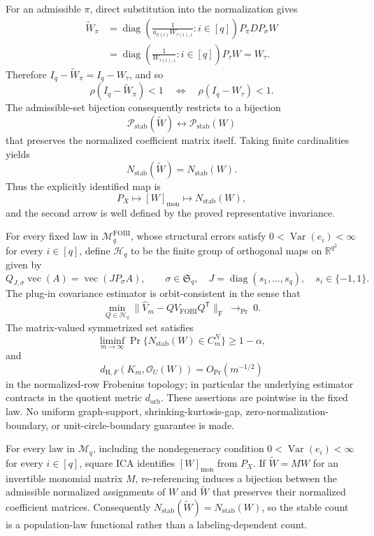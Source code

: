 For an admissible \(\pi\), direct substitution into the normalization gives
\[
 \begin{aligned}
 \widetilde W_\pi
 &=\operatorname{diag}\!\left(
      \frac{1}{a_{\pi(i)}W_{\tau(i),i}}:i\in[q]
    \right)P_\pi D P_\sigma W\\
 &=\operatorname{diag}\!\left(
      \frac{1}{W_{\tau(i),i}}:i\in[q]
    \right)P_\tau W
 =W_\tau.
 \end{aligned}
\]
Therefore \(I_q-\widetilde W_\pi=I_q-W_\tau\), and so
\[
 \rho(I_q-\widetilde W_\pi)<1
 \quad\Longleftrightarrow\quad
 \rho(I_q-W_\tau)<1.
\]
The admissible-set bijection consequently restricts to a bijection
\[
 \mathcal P_{\mathrm{stab}}(\widetilde W)
 \longleftrightarrow
 \mathcal P_{\mathrm{stab}}(W)
\]
that preserves the normalized coefficient matrix itself. Taking finite cardinalities yields
\[
 N_{\mathrm{stab}}(\widetilde W)=N_{\mathrm{stab}}(W).
\]
Thus the explicitly identified map is
\[
 P_X\longmapsto[W]_{\mathrm{mon}}
       \longmapsto N_{\mathrm{stab}}(W),
\]
and the second arrow is well defined by the proved representative invariance.

For every fixed law in \(\mathcal M_q^{\mathrm{FOBI}}\), whose structural errors satisfy \(0<\operatorname{Var}(e_i)<\infty\) for every \(i\in[q]\), define \(\mathcal H_q\) to be the finite group of orthogonal maps on \(\mathbb R^{q^2}\) given by
\[
 Q_{J,\sigma}\operatorname{vec}(A)=\operatorname{vec}(J P_\sigma A),
 \qquad
 \sigma\in\mathfrak S_q,
 \quad
 J=\operatorname{diag}(s_1,\ldots,s_q),
 \quad s_i\in\{-1,1\}.
\]
The plug-in covariance estimator is orbit-consistent in the sense that
\[
 \min_{Q\in\mathcal H_q}
 \|\widehat V_m-QV_{\mathrm{FOBI}}Q^{\mathsf T}\|_{\mathrm F}
 \ \longrightarrow_{\Pr}\ 0.
\]
The matrix-valued symmetrized set satisfies
\[
 \liminf_{m\to\infty}
 \Pr\{N_{\mathrm{stab}}(W)\in C_m^N\}\geq1-\alpha,
\]
and
\[
 d_{\mathrm H,F}(K_m,\mathcal O_U(W))=O_{\Pr}(m^{-1/2})
\]
in the normalized-row Frobenius topology; in particular the underlying estimator contracts in the quotient metric \(d_{\mathrm{orb}}\). These assertions are pointwise in the fixed law. No uniform graph-support, shrinking-kurtosis-gap, zero-normalization-boundary, or unit-circle-boundary guarantee is made.

For every law in \(\mathcal M_q\), including the nondegeneracy condition \(0<\operatorname{Var}(e_i)<\infty\) for every \(i\in[q]\), square ICA identifies \([W]_{\mathrm{mon}}\) from \(P_X\). If \(\widetilde W=MW\) for an invertible monomial matrix \(M\), re-referencing induces a bijection between the admissible normalized assignments of \(W\) and \(\widetilde W\) that preserves their normalized coefficient matrices. Consequently \(N_{\mathrm{stab}}(\widetilde W)=N_{\mathrm{stab}}(W)\), so the stable count is a population-law functional rather than a labeling-dependent count.

